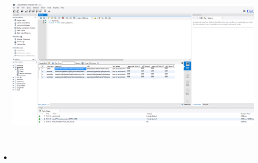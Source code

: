 \documentclass[paper=a4, fontsize=11pt]{scrartcl} %
\numberwithin{equation}{section} %
\numberwithin{figure}{section} %
\numberwithin{table}{section} %
\begin{document}
\begin{itemize}
\begin{itemize}
			\item 	
			 \includegraphics[width = 25cm, height=10cm]{pictures/worbetchdatabase.png}
		\end{itemize}


	\end{itemize}
\end{document}
